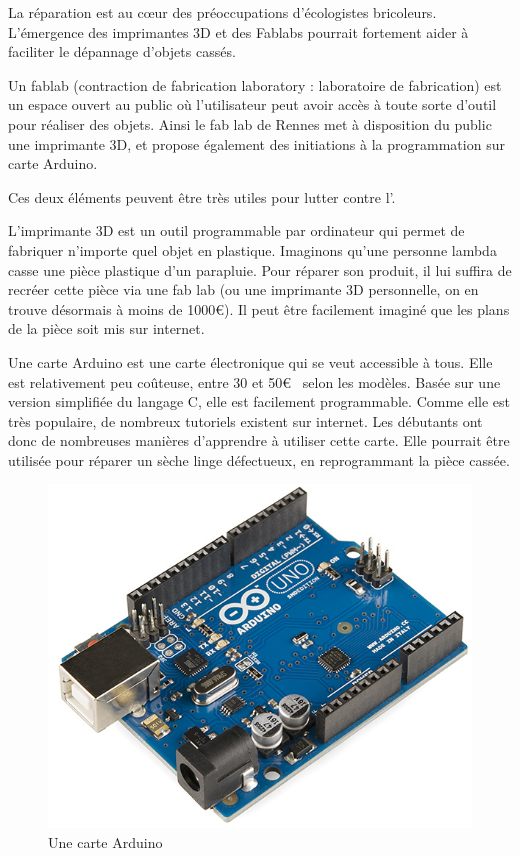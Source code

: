 La réparation est au cœur des préoccupations d'écologistes bricoleurs. L'émergence des imprimantes 3D et des Fablabs pourrait fortement aider  à faciliter le dépannage d'objets cassés. 

Un fablab (contraction de fabrication laboratory : laboratoire de fabrication) est un espace ouvert au public où l'utilisateur peut avoir accès à  toute sorte d'outil pour réaliser des objets. Ainsi le fab lab de Rennes met à disposition du public une imprimante 3D, et propose également des initiations à la programmation sur carte Arduino.

Ces deux éléments peuvent être très utiles pour lutter contre l'\op. 

L'imprimante 3D est un outil programmable par ordinateur qui permet de fabriquer n'importe quel objet en plastique. Imaginons qu'une personne lambda casse une pièce plastique d'un parapluie. Pour réparer son produit, il lui suffira de recréer cette pièce via une fab lab (ou une imprimante 3D personnelle, on en trouve désormais à moins de 1000\euro). Il peut être facilement imaginé que les plans de la pièce soit mis sur internet. 

\bigbreak
Une carte Arduino est une carte électronique qui se veut accessible à tous. Elle est relativement peu coûteuse, entre 30 et 50\euro~ selon les modèles. Basée sur une version simplifiée du langage C, elle est facilement programmable. Comme elle est très populaire, de nombreux tutoriels existent sur internet. Les débutants ont donc de nombreuses manières d'apprendre à utiliser cette carte. Elle pourrait être utilisée pour réparer un sèche linge défectueux, en reprogrammant la pièce cassée.

\begin{figure}
\begin{center}
\vspace{-1cm}\includegraphics[scale=0.25]{Rsc/Arduino.png} 

\caption{Une carte Arduino}
\end{center}
\end{figure}

